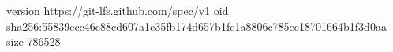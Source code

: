 version https://git-lfs.github.com/spec/v1
oid sha256:55839ecc46e88cd607a1c35fb174d657b1fc1a8806c785ee18701664b1f3d0aa
size 786528
